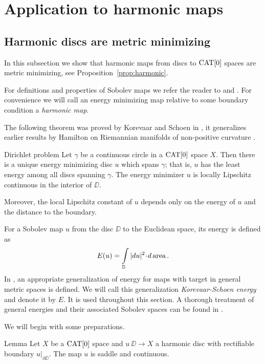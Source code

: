 \documentclass[a4paper,10pt]{amsart}
\begin{document}
\section{Application to harmonic maps}

\subsection{Harmonic discs are metric minimizing}

In this subsection we show that harmonic maps from discs to $\mathop{\rm CAT}\nolimits[0]$ spaces are metric minimizing, see Proposition~\ref{prop:harmonic}.

For definitions and properties of Sobolev maps we refer the reader to \cite{LW} and \cite{LW2}. For convenience we will call
an energy minimizing map relative to some boundary condition a {\em harmonic map}.


The following theorem was proved by Korevaar and Schoen in \cite{KS}, it generalizes earlier results by Hamilton on Riemannian manifolds of non-positive
curvature \cite{H}.

\begin{thm}{Dirichlet problem}\label{thm:dirichlet}
Let $\gamma$ be a continuous circle in a $\mathop{\rm CAT}\nolimits[0]$ space $X$. 
Then there is a unique energy minimizing disc $u$ which spans $\gamma$; 
that is, $u$
has the least energy among all discs spanning $\gamma$. 
The energy minimizer $u$ is locally Lipschitz continuous in the interior of $\DD$.

Moreover, the local Lipschitz constant of $u$ depends only on the energy of $u$ and the distance to the boundary.
\end{thm}

For a Sobolev map $u$ from the disc $\DD$ to the Euclidean space, its energy is defined as 
\[E(u)=\int\limits_\DD|du|^2\cdot d\area.\]
In \cite{KS}, an appropriate generalization of energy for maps with target in general metric spaces is defined.
We will call this generalization {\em Korevaar-Schoen energy} and denote it by $E$. It is used throughout this section. 
A thorough treatment of general energies and their associated Sobolev
spaces can be found in \cite{LW2}.



We will begin with some preparations. 


\begin{thm}{Lemma}\label{lem:harmsaddle}
Let $X$ be a $\mathop{\rm CAT}\nolimits[0]$ space and
$u\:\DD\to X$ a harmonic disc with rectifiable boundary $u|_{\partial \DD}$.
The map $u$ is saddle and continuous.
\end{thm}
\end{document}
